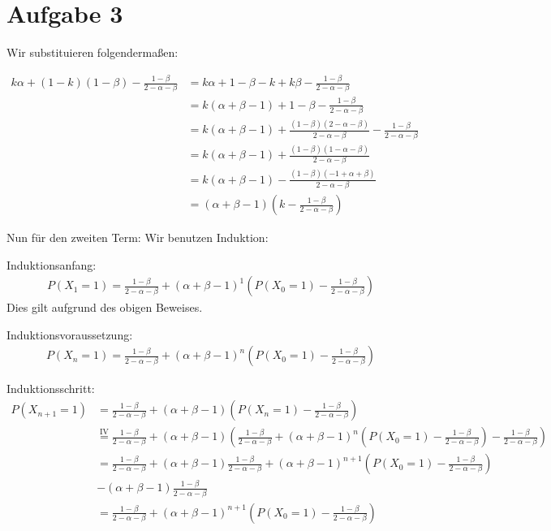 \documentclass[10pt,a4paper,parskip=half]{scrartcl}
\begin{document}
\section*{Aufgabe 3}
Wir substituieren folgendermaßen:

\begin{align*}
k\alpha + (1-k)(1-\beta) - \frac{1 -\beta}{2 -\alpha-\beta} &= k\alpha + 1 -\beta -k +k\beta - \frac{1 -\beta}{2 -\alpha-\beta} \\
&= k(\alpha + \beta - 1) + 1 - \beta - \frac{1 -\beta}{2 -\alpha-\beta} \\
&= k(\alpha + \beta - 1) + \frac{(1 -\beta)(2 -\alpha-\beta)}{2 -\alpha-\beta} - \frac{1 -\beta}{2 -\alpha-\beta} \\
&= k(\alpha + \beta - 1) + \frac{(1 -\beta)(1 -\alpha-\beta)}{2 -\alpha-\beta} \\
&= k(\alpha + \beta - 1) - \frac{(1 -\beta)(-1 +\alpha+\beta)}{2 -\alpha-\beta} \\
&= (\alpha+\beta-1)(k-\frac{1-\beta}{2-\alpha-\beta})
\end{align*}

Nun für den zweiten Term:
Wir benutzen Induktion:

Induktionsanfang: 
\begin{align*}
P(X_1 = 1) = \frac{1-\beta}{2-\alpha-\beta} + (\alpha +\beta -1)^1\left(P(X_0 = 1) - \frac {1-\beta}{2-\alpha-\beta}\right)
\end{align*}
Dies gilt aufgrund des obigen Beweises.

Induktionsvoraussetzung:
\begin{align*}
P(X_{n} = 1) = \frac{1-\beta}{2-\alpha-\beta} + (\alpha +\beta -1)^n\left(P(X_0 = 1) - \frac {1-\beta}{2-\alpha-\beta}\right)
\end{align*}

Induktionsschritt:
\begin{align*}
P(X_{n+1} = 1) &= \frac{1-\beta}{2-\alpha-\beta} + (\alpha +\beta -1)\left(P(X_n = 1) - \frac {1-\beta}{2-\alpha-\beta}\right)\\
&\overset{\text{IV}}{=} \frac{1-\beta}{2-\alpha-\beta} + (\alpha +\beta -1)\left(\frac{1-\beta}{2-\alpha-\beta} + (\alpha +\beta -1)^n\left(P(X_0 = 1) - \frac {1-\beta}{2-\alpha-\beta}\right) - \frac {1-\beta}{2-\alpha-\beta}\right)\\
&= \frac{1-\beta}{2-\alpha-\beta} + (\alpha +\beta -1)\frac{1-\beta}{2-\alpha-\beta} + (\alpha +\beta -1)^{n+1}\left(P(X_0 = 1) - \frac {1-\beta}{2-\alpha-\beta}\right)\\
&-(\alpha +\beta -1)\frac{1-\beta}{2-\alpha-\beta}\\
&= \frac{1-\beta}{2-\alpha-\beta} + (\alpha +\beta -1)^{n+1}\left(P(X_0 = 1) - \frac {1-\beta}{2-\alpha-\beta}\right)
\end{align*}
\end{document}
